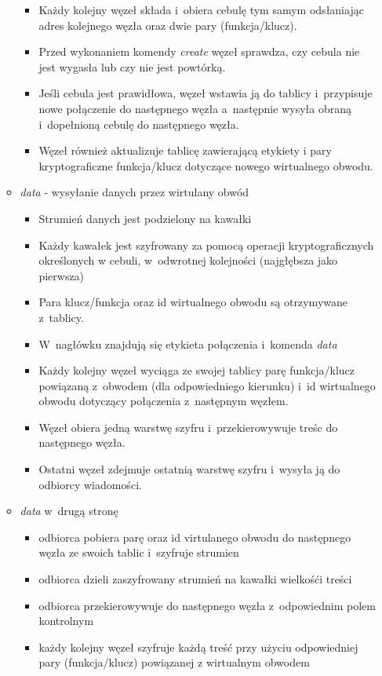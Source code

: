 \begin{itemize}
\begin{itemize}
\begin{itemize}
	    \item Każdy kolejny węzeł składa i~obiera cebulę tym samym odsłaniając adres kolejnego węzła oraz dwie pary (funkcja/klucz).
	    \item Przed wykonaniem komendy \textit{create} węzeł sprawdza, czy cebula nie jest wygasła lub czy nie jest powtórką.
	    \item Jeśli cebula jest prawidłowa, węzeł wstawia ją do tablicy i~przypisuje nowe połączenie do następnego węzła a~następnie wysyła obraną i~dopełnioną cebulę do następnego węzła.
	    \item Węzeł również aktualizuje tablicę zawierającą etykiety i pary kryptograficzne funkcja/klucz dotyczące nowego wirtualnego obwodu.
	   \end{itemize}
	   \item \textit{data} - wysyłanie danych przez wirtulany obwód 
	   \begin{itemize}
	    \item Strumień danych jest podzielony na kawałki
	    \item Każdy kawałek jest szyfrowany za pomocą operacji kryptograficznych określonych w cebuli, w~odwrotnej kolejności (najgłębsza jako pierwsza)
	    \item Para klucz/funkcja oraz id wirtualnego obwodu są otrzymywane z~tablicy.
	    \item W~nagłówku znajdują się etykieta połączenia i~komenda \textit{data}
	    \item Każdy kolejny węzeł wyciąga ze swojej tablicy parę funkcja/klucz powiązaną z~obwodem (dla odpowiedniego kierunku) i~id wirtualnego obwodu dotyczący połączenia z~następnym węzłem.
	    \item Węzeł obiera jedną warstwę szyfru i~przekierowywuje treśc do następnego węzła.
	    \item Ostatni węzeł zdejmuje ostatnią warstwę szyfru i~wysyła ją do odbiorcy wiadomości.
	   \end{itemize}
	   \item \textit{data} w~drugą stronę
	   \begin{itemize}
	    \item odbiorca pobiera parę oraz id virtulanego obwodu do następnego węzła ze swoich tablic i~szyfruje strumien
	    \item odbiorca dzieli zaszyfrowany strumień na kawałki wielkośći treści
	    \item odbiorca przekierowywuje do następnego węzła z~odpowiednim polem kontrolnym
	    \item każdy kolejny węzeł szyfruje każdą treść przy użyciu odpowiedniej pary (funkcja/klucz) powiązanej z wirtualnym obwodem

\end{itemize}
\end{itemize}
\end{itemize}
